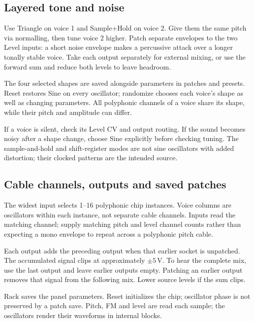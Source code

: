 \subsection{Layered tone and noise}
Use Triangle on voice 1 and Sample+Hold on voice 2. Give them the same pitch
via normalling, then tune voice 2 higher. Patch separate envelopes to the two
Level inputs: a short noise envelope makes a percussive attack over a longer
tonally stable voice. Take each output separately for external mixing, or
use the forward sum and reduce both levels to leave headroom.

The four selected shapes are saved alongside parameters in patches and
presets. Reset restores Sine on every oscillator; randomize chooses each voice's shape
as well as changing parameters. All polyphonic channels of a voice share its
shape, while their pitch and amplitude can differ.

If a voice is silent, check its Level CV and output routing. If the sound
becomes noisy after a shape change, choose Sine explicitly before checking
tuning. The sample-and-hold and shift-register modes are not sine oscillators
with added distortion; their clocked patterns are the intended source.

\subsection{Cable channels, outputs and saved patches}
The widest input selects 1--16 polyphonic chip instances. Voice columns are
oscillators within each instance, not separate cable channels. Inputs read
the matching channel; supply matching pitch and level channel counts rather
than expecting a mono envelope to repeat across a polyphonic pitch cable.

Each output adds the preceding output when that earlier socket is unpatched.
The accumulated signal clips at approximately $\pm5$\,V. To hear the complete
mix, use the last output and leave earlier outputs empty. Patching an earlier
output removes that signal from the following mix. Lower source levels if
the sum clips.

Rack saves the panel parameters. Reset initializes the chip; oscillator
phase is not preserved by a patch save. Pitch, FM and level are read each sample; the oscillators render their
waveforms in internal blocks.

